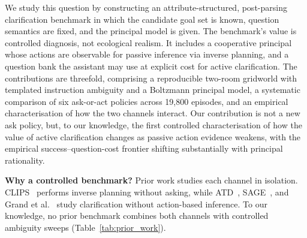 \documentclass[10pt,twocolumn]{article}
\begin{document}
We study this question by constructing an attribute-structured, post-parsing clarification benchmark in which the candidate goal set is known, question semantics are fixed, and the principal model is given.
The benchmark's value is controlled diagnosis, not ecological realism.
It includes a cooperative principal whose actions are observable for passive inference via inverse planning, and a question bank the assistant may use at explicit cost for active clarification.
The contributions are threefold, comprising a reproducible two-room gridworld with templated instruction ambiguity and a Boltzmann principal model, a systematic comparison of six ask-or-act policies across 19{,}800 episodes, and an empirical characterisation of how the two channels interact.
Our contribution is not a new ask policy, but, to our knowledge, the first controlled characterisation of how the value of active clarification changes as passive action evidence weakens, with the empirical success--question-cost frontier shifting substantially with principal rationality.

\textbf{Why a controlled benchmark?}
Prior work studies each channel in isolation. CLIPS~\cite{tan2024clips} performs inverse planning without asking, while ATD~\cite{kobalczyk2025active}, SAGE~\cite{suri2025structured}, and Grand et al.~\cite{grand2026shoot} study clarification without action-based inference.
To our knowledge, no prior benchmark combines both channels with controlled ambiguity sweeps (Table~\ref{tab:prior_work}).

\begin{table}[h]
\centering
\caption{Illustrative comparison to closest prior work (not an exhaustive survey).
\checkmark~=~present; $\circ$~=~partial; --~=~absent.}
\label{tab:prior_work}
\end{table}
\end{document}
